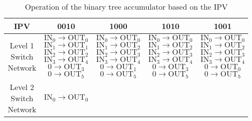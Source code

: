 \begin{table}
    \caption{Operation of the binary tree accumulator based on the IPV}
    \label{tbl:ipv}
    \begin{tabular}{|c|c|c|c|c|}
        \hline
        IPV & 0010 & 1000 & 1010 & 1001 \\ 
        \hline
        \shortstack{Level 1\\Switch\\Network} &
        \shortstack{$\textrm{IN}_0 \rightarrow \textrm{OUT}_0$\\
        $\textrm{IN}_1 \rightarrow \textrm{OUT}_1$\\
    $\textrm{IN}_2 \rightarrow \textrm{OUT}_2$\\
$\textrm{IN}_3 \rightarrow \textrm{OUT}_4$\\
$0 \rightarrow \textrm{OUT}_3$\\
$0 \rightarrow \textrm{OUT}_5$} &
        \shortstack{$\textrm{IN}_0 \rightarrow \textrm{OUT}_0$\\
        $\textrm{IN}_1 \rightarrow \textrm{OUT}_2$\\
        $\textrm{IN}_2 \rightarrow \textrm{OUT}_3$\\
    $\textrm{IN}_3 \rightarrow \textrm{OUT}_4$\\
$0 \rightarrow \textrm{OUT}_1$\\
$0 \rightarrow \textrm{OUT}_5$} &
\shortstack{$\textrm{IN}_0 \rightarrow \textrm{OUT}_0$\\
$\textrm{IN}_1 \rightarrow \textrm{OUT}_2$\\
$\textrm{IN}_2 \rightarrow \textrm{OUT}_3$\\
$\textrm{IN}_3 \rightarrow \textrm{OUT}_4$\\
$0 \rightarrow \textrm{OUT}_3$\\
$0 \rightarrow \textrm{OUT}_5$} &
\shortstack{$\textrm{IN}_0 \rightarrow \textrm{OUT}_0$\\
$\textrm{IN}_1 \rightarrow \textrm{OUT}_2$\\
$\textrm{IN}_2 \rightarrow \textrm{OUT}_3$\\
$\textrm{IN}_3 \rightarrow \textrm{OUT}_4$\\
$0 \rightarrow \textrm{OUT}_0$\\
$0 \rightarrow \textrm{OUT}_5$}\\
        \hline
        \shortstack{Level 2\\Switch\\Network} &
\shortstack{$\textrm{IN}_0 \rightarrow \textrm{OUT}_0$\\
}
\end{tabular}
\end{table}

